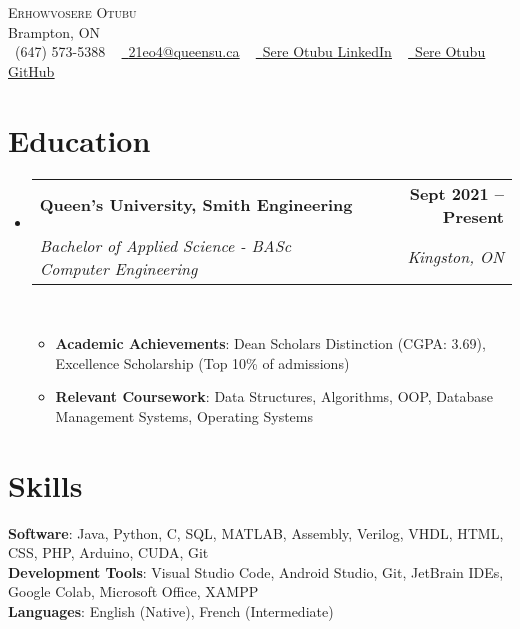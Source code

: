 \documentclass[letterpaper,11pt]{article}
\makeatletter
\newcommand{\resumeItem}[1]{
  \item\small{
    {#1 \vspace{-2pt}}
  }
}
\newcommand{\resumeSubheading}[4]{
  \vspace{-2pt}\item
    \begin{tabular*}{1.0\textwidth}[t]{l@{\extracolsep{\fill}}r}
      \textbf{#1} & \textbf{\small #2} \\
      \textit{\small#3} & \textit{\small #4} \\
    \end{tabular*}\vspace{-7pt}
}
\newcommand{\resumeSubHeadingListStart}{\begin{itemize}[leftmargin=0.0in, label={}]}
\newcommand{\resumeSubHeadingListEnd}{\end{itemize}}
\newcommand{\resumeItemListStart}{\begin{itemize}}
\newcommand{\resumeItemListEnd}{\end{itemize}\vspace{-5pt}}
\makeatother
\begin{document}

\begin{center}
    {\Huge \scshape Erhowvosere Otubu} \\ \vspace{1pt}
    Brampton, ON \\ \vspace{1pt}
    \small \raisebox{-0.1\height}\faPhone\ (647) 573-5388 ~ \href{mailto:youremail@email.com}{\raisebox{-0.2\height}\faEnvelope\  \underline{21eo4@queensu.ca}} ~ 
    \href{https://www.linkedin.com/in/sere-otubu-9782b1251/}{\raisebox{-0.2\height}\faLinkedin\ \underline{Sere Otubu LinkedIn}}  ~
    \href{https://github.com/IceBergSlim111}{\raisebox{-0.2\height}\faGithub\ \underline{Sere Otubu GitHub}}
    \vspace{-8pt}
\end{center}

\section{Education}
  \resumeSubHeadingListStart
    \resumeSubheading
      {Queen's University, Smith Engineering}{Sept 2021 -- Present}
      {Bachelor of Applied Science - BASc Computer Engineering}{Kingston, ON}\
      \resumeItemListStart
      \resumeItem{\textbf{Academic Achievements}: Dean Scholars Distinction (CGPA: 3.69), Excellence Scholarship (Top 10\% of admissions)}
      \resumeItem{\textbf{Relevant Coursework}: Data Structures, Algorithms, OOP, Database Management Systems, Operating Systems}
      \resumeItemListEnd
  \resumeSubHeadingListEnd

\section{Skills}
 \begin{itemize}[leftmargin=0.15in, label={}]
    \small{\item{
     \textbf{Software}{: Java, Python, C, SQL, MATLAB, Assembly, Verilog, VHDL, HTML, CSS, PHP, Arduino, CUDA, Git} \\
    \textbf{Development Tools}{: Visual Studio Code, Android Studio, Git, JetBrain IDEs, Google Colab, Microsoft Office, XAMPP} \\
    \textbf{Languages}{: English (Native), French (Intermediate)} \\
    }}
 \end{itemize}
 \vspace{-16pt}
\end{document}
